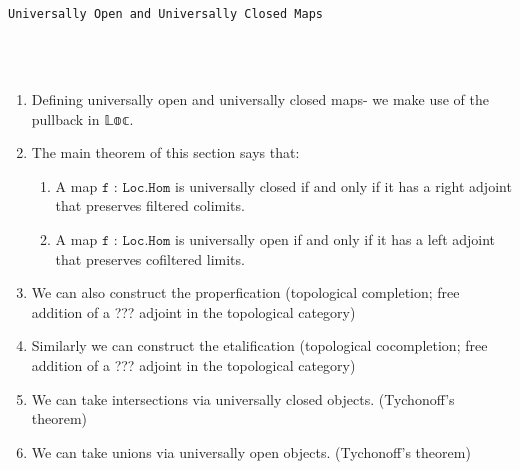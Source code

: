 \documentclass{book}
\theoremstyle{definition}
\newcounter{lcounter}
\renewcommand{\chapter}[1]{
\newpage
{
\Huge 
\begin{center}
\ \\
\ \\
\thispagestyle{empty}
\texttt{#1}
\end{center}}
\ \\
\ \\
}
\begin{document}
\chapter{Universally Open and Universally Closed Maps}


\begin{enumerate}
\item Defining universally open and universally closed maps- we make use of the pullback in 𝕃𝕠𝕔.
\item The main theorem of this section says that:
\begin{enumerate}
\item A map $\texttt{f : Loc.Hom}$ is universally closed if and only if it has a right adjoint that preserves filtered colimits.
\item A map $\texttt{f : Loc.Hom}$ is universally open if and only if it has a left adjoint that preserves cofiltered limits.
\end{enumerate} 
\item We can also construct the properfication (topological completion; free addition of a ??? adjoint in the topological category)
\item Similarly we can construct the etalification (topological cocompletion; free addition of a ??? adjoint in the topological category)
\item We can take intersections via universally closed objects. (Tychonoff's theorem)
\item We can take unions via universally open objects. (Tychonoff's theorem)
\end{enumerate}


\begin{center}
\begin{tcolorbox}[width=5in,colback={white},title={\begin{center}\texttt{Lean \thelcounter} \addtocounter{lcounter}{1}  \end{center}},colbacktitle=Blue,coltitle=black]
\begin{verbatim}

\end{verbatim}
\end{tcolorbox}
\end{center}

\begin{center}
\begin{tcolorbox}[width=5in,colback={white},title={\begin{center}\texttt{Lean \thelcounter} \addtocounter{lcounter}{1}  \end{center}},colbacktitle=Blue,coltitle=black]
\begin{verbatim}

\end{verbatim}
\end{tcolorbox}
\end{center}
\end{document}
